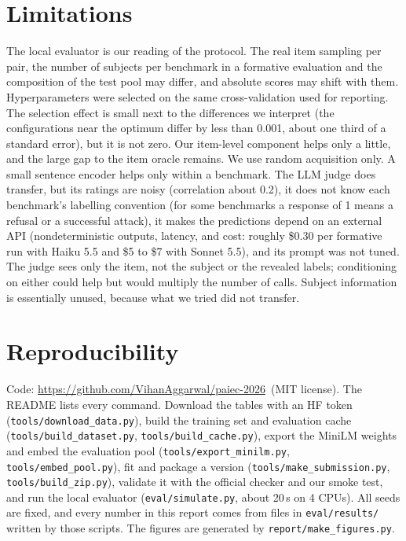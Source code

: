 \documentclass{article}
\newcommand{\REPOURL}{\url{https://github.com/VihanAggarwal/paiec-2026}}
\begin{document}
\section{Limitations}

The local evaluator is our reading of the protocol. The real item sampling per pair, the number of
subjects per benchmark in a formative evaluation and the composition of the test pool may differ,
and absolute scores may shift with them. Hyperparameters were selected on the same cross-validation
used for reporting. The selection effect is small next to the differences we interpret (the
configurations near the optimum differ by less than 0.001, about one third of a standard error), but
it is not zero. Our item-level component helps only a little, and the large gap to the item oracle
remains. We use random acquisition only. A small sentence encoder helps only within a benchmark.
The LLM judge does transfer, but its ratings are noisy (correlation about 0.2), it does not know
each benchmark's labelling convention (for some benchmarks a response of 1 means a refusal or a
successful attack), it makes the predictions depend on an external API (nondeterministic outputs,
latency, and cost: roughly \$0.30 per formative run with Haiku 5.5 and \$5 to \$7 with Sonnet 5.5),
and its prompt was not tuned. The judge sees only the item, not the subject or the revealed labels;
conditioning on either could help but would multiply the number of calls. Subject information is essentially
unused, because what we tried did not transfer.

\section{Reproducibility}

Code: \REPOURL\ (MIT license). The README lists every command. Download the tables with an HF token
(\texttt{tools/download\_data.py}), build the training set and evaluation cache
(\texttt{tools/build\_dataset.py}, \texttt{tools/build\_cache.py}), export the MiniLM weights and embed the evaluation pool
(\texttt{tools/export\_minilm.py}, \texttt{tools/embed\_pool.py}), fit and package a version
(\texttt{tools/make\_submission.py}, \texttt{tools/build\_zip.py}), validate it with the official
checker and our smoke test, and run the local evaluator (\texttt{eval/simulate.py}, about 20\,s on 4
CPUs). All seeds are fixed, and every number in this report comes from files in \texttt{eval/results/}
written by those scripts. The figures are generated by \texttt{report/make\_figures.py}.
\end{document}

